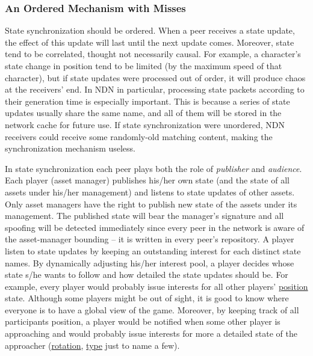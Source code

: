 \documentclass{sigchi}
\begin{document}
\subsubsection{An Ordered Mechanism with Misses}
\label{orderedmiss}
State synchronization should be ordered. When a peer receives a state update, the effect of this update will last until the next update comes. Moreover, state tend to be correlated, thought not necessarily causal. For example, a character's state change in position tend to be limited (by the maximum speed of that character), but if state updates were processed out of order, it will produce chaos at the receivers' end. In NDN in particular, processing state packets according to their generation time is especially important. This is because a series of state updates usually share the same name, and all of them will be stored in the network cache for future use. If state synchronization were unordered, NDN receivers could receive some randomly-old matching content, making the synchronization mechanism useless.

In state synchronization each peer plays both the role of \emph{publisher} and \emph{audience}. Each player (asset manager) publishes his/her own state (and the state of all assets under his/her management) and listens to state updates of other assets. Only asset managers have the right to publish new state of the assets under its management. The published state will bear the manager's signature and all spoofing will be detected immediately since every peer in the network is aware of the asset-manager bounding -- it is written in every peer's repository. A player listen to state updates by keeping an outstanding interest for each distinct state names. By dynamically adjusting his/her interest pool, a player decides whose state s/he wants to follow and how detailed the state updates should be. For example, every player would probably issue interests for all other players' \url{position} state. Although some players might be out of sight, it is good to know where everyone is to have a global view of the game. Moreover, by keeping track of all participants position, a player would be notified when some other player is approaching and would probably issue interests for more a detailed state of the approacher (\url{rotation}, \url{type} just to name a few).
\end{document}
